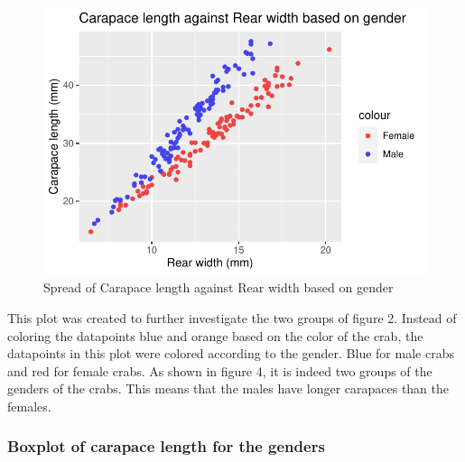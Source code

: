 \documentclass[
]{article}
\begin{document}
\begin{figure}[H]

{\centering \includegraphics{Log_files/figure-latex/figure4-1} 

}

\caption{Spread of Carapace length against Rear width based on gender}\label{fig:figure4}
\end{figure}

This plot was created to further investigate the two groups of figure 2.
Instead of coloring the datapoints blue and orange based on the color of
the crab, the datapoints in this plot were colored according to the
gender. Blue for male crabs and red for female crabs. As shown in figure
4, it is indeed two groups of the genders of the crabs. This means that
the males have longer carapaces than the females. \newpage

\hypertarget{boxplot-of-carapace-length-for-the-genders}{%
\subsubsection{Boxplot of carapace length for the
genders}\label{boxplot-of-carapace-length-for-the-genders}}
\end{document}
